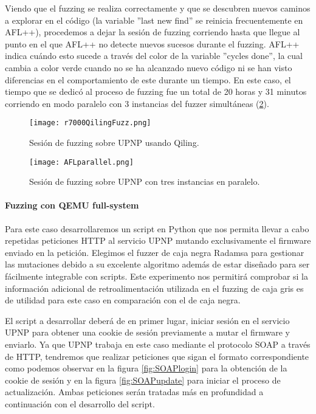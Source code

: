 Viendo que el fuzzing se realiza correctamente y que se descubren nuevos caminos a explorar en el código (la variable ''last new find'' se reinicia frecuentemente en AFL++), procedemos a dejar la 
sesión de fuzzing corriendo hasta que llegue al punto en el que AFL++ no detecte nuevos sucesos durante el fuzzing. AFL++ indica cuándo
esto sucede a través del color de la variable ''cycles done'', la cual cambia a color verde cuando no se ha alcanzado nuevo código 
ni se han visto diferencias en el comportamiento de este durante un tiempo. En este caso, el tiempo que se dedicó al proceso de fuzzing 
fue un total de 20 horas y 31 minutos corriendo en modo paralelo con 3 instancias del fuzzer simultáneas (\ref{fig:R7000parallel}).

\begin{figure}[H]
    \centering
    \texttt{[image: r7000QilingFuzz.png]}
    \caption{Sesión de fuzzing sobre UPNP usando Qiling.}
    \label{fig:R7000QilingFuzz}
\end{figure}

\begin{figure}[H]
    \centering
    \texttt{[image: AFLparallel.png]}
    \caption{Sesión de fuzzing sobre UPNP con tres instancias en paralelo.}
    \label{fig:R7000parallel}
\end{figure}

\paragraph{Fuzzing con QEMU full-system}
Para este caso desarrollaremos un script en Python que nos permita llevar a cabo repetidas peticiones HTTP
al servicio UPNP mutando exclusivamente el firmware enviado en la petición. Elegimos el fuzzer de caja negra Radamsa\cite{radamsa} para gestionar las mutaciones debido a su excelente algoritmo además de estar diseñado para ser fácilmente integrable con scripts. Este experimento nos 
permitirá comprobar si la información adicional de retroalimentación utilizada en el fuzzing de caja gris es 
de utilidad para este caso en comparación con el de caja negra.\bigskip

El script a desarrollar deberá de en primer lugar, iniciar sesión en el servicio UPNP para obtener una cookie de sesión
previamente a mutar el firmware y enviarlo. Ya que UPNP trabaja en este caso mediante el protocolo SOAP a través de HTTP,
tendremos que realizar peticiones que sigan el formato correspondiente como podemos observar en la figura \ref{fig:SOAPlogin}
para la obtención de la cookie de sesión y en la figura \ref{fig:SOAPupdate} para iniciar el proceso de actualización.
Ambas peticiones serán tratadas más en profundidad a continuación con el desarrollo del script.

